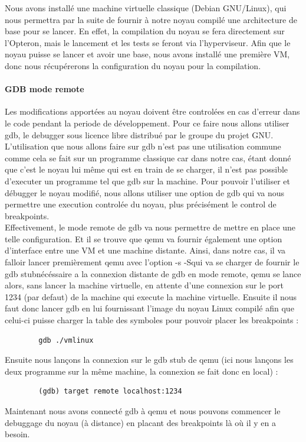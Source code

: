         Nous avons installé une machine virtuelle classique (Debian GNU/Linux), qui
        nous permettra par la suite de fournir à notre noyau compilé une
        architecture de base pour se lancer. En effet, la compilation du noyau se
        fera directement sur l'Opteron, mais le lancement et les tests se feront via
        l'hyperviseur. Afin que le noyau puisse se lancer et avoir une base, nous
        avons installé une première VM, donc nous récupérerons la configuration du
        noyau pour la compilation.

    \paragraph{GDB mode remote}

        Les modifications apportées au noyau doivent être controlées en cas d'erreur 
        dans le code pendant la periode de développement. Pour ce faire nous allons 
        utiliser gdb, le debugger sous licence libre distribué par le groupe du 
        projet GNU. L'utilisation que nous allons faire sur gdb n'est pas une 
        utilisation commune comme cela se fait sur un programme classique car
        dans notre cas, étant donné que c'est le noyau lui même qui est en train de se
        charger, il n'est pas possible d'executer un programme tel que gdb sur la 
        machine. Pour pouvoir l'utiliser et débugger le noyau modifié, nous allons
        utiliser une option de gdb qui va nous permettre une execution controlée
        du noyau, plus précisément le control de breakpoints. \\

        Effectivement, le mode remote de gdb va nous permettre de mettre en place 
        une telle configuration. Et il se trouve que qemu va fournir également 
        une option d'interface entre une VM et une machine distante.
        Ainsi, dans notre cas, il va falloir lancer premièrement qemu avec l'option
        \og -s -S\fg qui va se charger de fournir le \og gdb stub\fg nécéssaire a la 
        connexion distante de gdb en mode remote, qemu se lance alors, sans lancer 
        la machine virtuelle, en attente d'une connexion sur le port 1234 
        (par defaut) de la machine qui execute la machine virtuelle.
        Ensuite il nous faut donc lancer gdb en lui fournissant l'image du noyau 
        Linux compilé afin que celui-ci puisse charger la table des symboles 
        pour pouvoir placer les breakpoints :
        \begin{lstlisting}
        gdb ./vmlinux
        \end{lstlisting}
        Ensuite nous lançons la connexion sur le gdb stub de qemu (ici nous lançons 
        les deux programme sur la même machine, la connexion se fait donc en local) :
        \begin{lstlisting}
        (gdb) target remote localhost:1234
        \end{lstlisting}
        Maintenant nous avons connecté gdb à qemu et nous pouvons commencer le 
        debuggage du noyau (à distance) en placant des breakpoints là où il y en a
        besoin.

